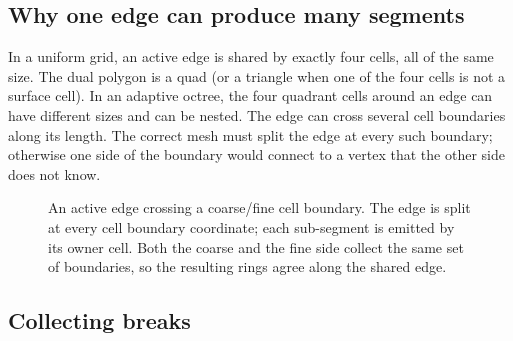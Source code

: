 \subsection{Why one edge can produce many segments}

In a uniform grid, an active edge is shared by exactly four cells, all of
the same size.  The dual polygon is a quad (or a triangle when one of the
four cells is not a surface cell).  In an adaptive octree, the four
quadrant cells around an edge can have different sizes and can be nested.
The edge can cross several cell boundaries along its length.  The correct
mesh must split the edge at every such boundary; otherwise one side of the
boundary would connect to a vertex that the other side does not know.

\begin{figure}[htbp]
\centering
{}
\caption{An active edge crossing a coarse/fine cell boundary.  The edge is
split at every cell boundary coordinate; each sub-segment is emitted by its
owner cell.  Both the coarse and the fine side collect the same set of
boundaries, so the resulting rings agree along the shared edge.}
\label{fig:edge-split}
\end{figure}

\subsection{Collecting breaks}

